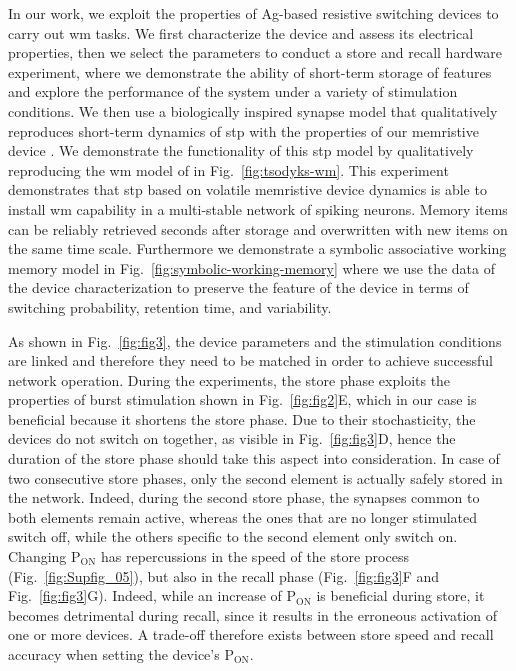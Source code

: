 In our work, we exploit the properties of Ag-based resistive switching devices to carry out \gls{wm} tasks. We first characterize the device and assess its electrical properties, then we select the parameters to conduct a store and recall hardware experiment, where we demonstrate the ability of short-term storage of features and explore the performance of the system under a variety of stimulation conditions.
We then use a biologically inspired synapse model that qualitatively reproduces short-term dynamics of \gls{stp} with the properties of our memristive device \cite{zucker1989short, tsodyks1998neural}. We demonstrate the functionality of this \gls{stp} model by qualitatively reproducing the \gls{wm} model of \cite{mongillo2008synaptic} in Fig.~\ref{fig:tsodyks-wm}.
This experiment demonstrates that \gls{stp} based on volatile memristive device dynamics is able to install \gls{wm} capability in a multi-stable network of spiking neurons. Memory items can be reliably retrieved seconds after storage and overwritten with new items on the same time scale. Furthermore we demonstrate a symbolic associative working memory model in Fig.~\ref{fig:symbolic-working-memory} where we use the data of the device characterization to preserve the feature of the device in terms of switching probability, retention time, and variability.

As shown in Fig.~\ref{fig:fig3}, the device parameters and the stimulation conditions are linked and therefore they need to be matched in order to achieve successful network operation. During the experiments, the store phase exploits the properties of burst stimulation shown in Fig.~\ref{fig:fig2}E, which in our case is beneficial because it shortens the store phase. Due to their stochasticity, the devices do not switch on together, as visible in Fig.~\ref{fig:fig3}D, hence the duration of the store phase should take this aspect into consideration. In case of two consecutive store phases, only the second element is actually safely stored in the network. Indeed, during the second store phase, the synapses common to both elements remain active, whereas the ones that are no longer stimulated switch off, while the others specific to the second element only switch on.
Changing P$\mathrm{_{ON}}$ has repercussions in the speed of the store process (Fig.~\ref{fig:Supfig_05}), but also in the recall phase (Fig.~\ref{fig:fig3}F and Fig.~\ref{fig:fig3}G). Indeed, while an increase of P$\mathrm{_{ON}}$ is beneficial during store, it becomes detrimental during recall, since it results in the erroneous activation of one or more devices. A trade-off therefore exists between store speed and recall accuracy when setting the device's P$\mathrm{_{ON}}$.

